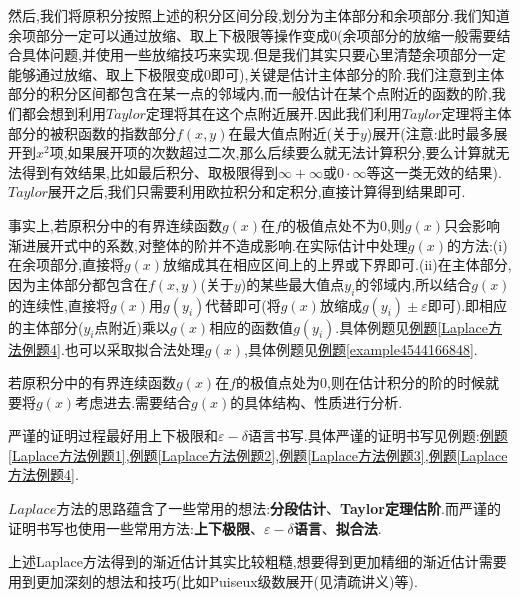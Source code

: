 \documentclass[../../main.tex]{subfiles}
\begin{document}
然后,我们将原积分按照上述的积分区间分段,划分为主体部分和余项部分.我们知道余项部分一定可以通过放缩、取上下极限等操作变成0(余项部分的放缩一般需要结合具体问题,并使用一些放缩技巧来实现.但是我们其实只要心里清楚余项部分一定能够通过放缩、取上下极限变成0即可),关键是估计主体部分的阶.我们注意到主体部分的积分区间都包含在某一点的邻域内,而一般估计在某个点附近的函数的阶,我们都会想到利用$Taylor$定理将其在这个点附近展开.因此我们利用$Taylor$定理将主体部分的被积函数的指数部分$f(x,y)$在最大值点附近(关于$y$)展开(注意:此时最多展开到$x^2$项,如果展开项的次数超过二次,那么后续要么就无法计算积分,要么计算就无法得到有效结果,比如最后积分、取极限得到$\infty+\infty$或$0\cdot \infty$等这一类无效的结果).
$Taylor$展开之后,我们只需要利用欧拉积分和定积分,直接计算得到结果即可.

事实上,若原积分中的有界连续函数$g(x)$在$f$的极值点处不为$0$,则$g(x)$只会影响渐进展开式中的系数,对整体的阶并不造成影响.在实际估计中处理$g(x)$的方法:(i)在余项部分,直接将$g(x)$放缩成其在相应区间上的上界或下界即可.(ii)在主体部分,因为主体部分都包含在$f(x,y)$(关于$y$)的某些最大值点$y_i$的邻域内,所以结合$g(x)$的连续性,直接将$g(x)$用$g(y_i)$代替即可(将$g(x)$放缩成$g(y_i)\pm \varepsilon$即可).即相应的主体部分($y_i$点附近)乘以$g(x)$相应的函数值$g(y_i)$.具体例题见\hyperref[Laplace方法例题4]{例题\ref{Laplace方法例题4}}.也可以采取拟合法处理$g(x)$,具体例题见\hyperref[example4544166848]{例题\ref{example4544166848}}.

若原积分中的有界连续函数$g(x)$在$f$的极值点处为$0$,则在估计积分的阶的时候就要将$g(x)$考虑进去.需要结合$g(x)$的具体结构、性质进行分析.

严谨的证明过程最好用上下极限和$\varepsilon-\delta$语言书写.具体严谨的证明书写见例题:\hyperref[Laplace方法例题1]{例题\ref{Laplace方法例题1}},\hyperref[Laplace方法例题2]{例题\ref{Laplace方法例题2}},\hyperref[Laplace方法例题3]{例题\ref{Laplace方法例题3}},\hyperref[Laplace方法例题4]{例题\ref{Laplace方法例题4}}.
\begin{note}
$Laplace$方法的思路蕴含了一些常用的想法:\textbf{分段估计}、\textbf{Taylor定理估阶}.而严谨的证明书写也使用一些常用方法:\textbf{上下极限}、\textbf{$\varepsilon-\delta$语言}、\textbf{拟合法}.
\end{note}
\begin{remark}
上述Laplace方法得到的渐近估计其实比较粗糙,想要得到更加精细的渐近估计需要用到更加深刻的想法和技巧(比如Puiseux级数展开(见清疏讲义)等).
\end{remark}
\end{document}

